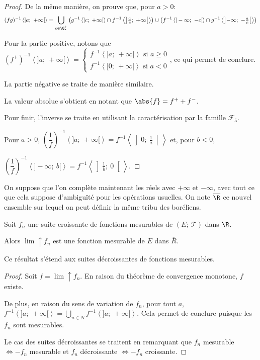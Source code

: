 \begin{proof}
De la même manière, on prouve que, pour $a>0$:
\[(fg)^{-1}\left<]a;~+\infty[\right> = \bigcup \limits_{c \in \Q^{+}_{*}} \left(g^{-1}\left<]c;~+\infty[\right> \cap f^{-1}\left<\left]\tfrac{a}{c};~+\infty\right[\right>\right) \cup \left(f^{-1}\left<]-\infty;~-c[\right> \cap g^{-1}\left<\left]-\infty;~-\tfrac{a}{c}\right[\right>\right)\]

Pour la partie positive, notons que 
$\left(f^{+}\right)^{-1}\left<]a;~+\infty[\right>  = \begin{cases}f^{-1}\left<]a;~+\infty[\right> \text{ si $a \geq 0$}\\ f^{-1}\left<[0;~+\infty[\right> \text{ si $a < 0$}\end{cases}$, ce qui permet de conclure.

La partie négative se traite de manière similaire.

La valeur absolue s'obtient en notant que $\abs{f} = f^{+} + f^{-}$.

Pour finir, l'inverse se traite en utilisant la caractérisation par la famille $\mathcal{F}_5$. 

Pour $a>0$, $\left(\dfrac{1}{f}\right)^{-1}\left<]a;~+\infty[\right> = f^{-1}\left<\left]0;~\tfrac{1}{a}\right[\right>$ et, pour $b<0$, 

$\left(\dfrac{1}{f}\right)^{-1}\left<]-\infty;~b[\right> = f^{-1}\left<\left]\tfrac{1}{b};~0\right[\right>$.
\end{proof}

On suppose que l'on complète maintenant les réels avec $+\infty$ et $-\infty$, avec tout ce que cela suppose d’ambiguïté pour les opérations usuelles. On note $\overline{\R}$ ce nouvel ensemble sur lequel on peut définir la même tribu des boréliens.

\begin{prop}
Soit $f_n$ une suite croissante de fonctions mesurables de $\left(E;~\mathcal{T}\right)$ dans $\R$.

Alors $\lim \uparrow f_n$ est une fonction mesurable de $E$ dans $\overline{R}$.

Ce résultat s'étend aux suites décroissantes de fonctions mesurables.
\end{prop}

\begin{proof}
Soit $f = \lim \uparrow f_n$. En raison du théorème de convergence monotone, $f$ existe.

De plus, en raison du sens de variation de $f_n$, pour tout $a$, $f^{-1}\left<]a;~+\infty[\right> = \bigcup \limits_{n \in N} f^{-1}\left<]a;~+\infty[\right>$. Cela permet de conclure puisque les $f_n$ sont mesurables.

Le cas des suites décroissantes se traitent en remarquant que $f_n$ mesurable $\iff -f_n$ mesurable et $f_n$ décroissante $\iff -f_n$ croissante.
\end{proof}

